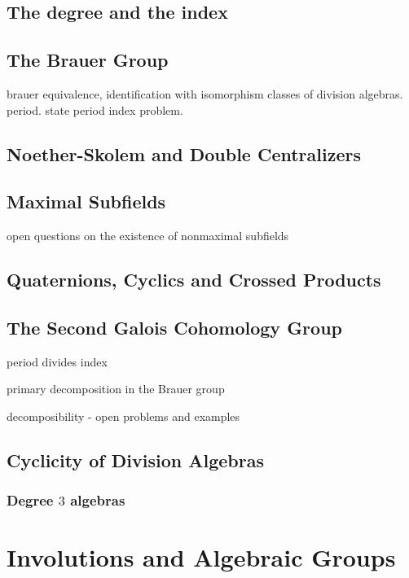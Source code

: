 \documentclass[12pt]{report}
\theoremstyle{plain}
\newcommand{\todo}[1]{\textcolor{todo}{#1}}
\begin{document}
\section{The degree and the index}


\section{The Brauer Group}

\todo{
brauer equivalence, identification with isomorphism classes of division
algebras. period. state period index problem.
}

\section{Noether-Skolem and Double Centralizers}

\section{Maximal Subfields}

\todo{open questions on the existence of nonmaximal subfields}

\section{Quaternions, Cyclics and Crossed Products}

\section{The Second Galois Cohomology Group}

\todo{period divides index}

\todo{primary decomposition in the Brauer group}

\todo{decomposibility - open problems and examples}

\section{Cyclicity of Division Algebras}

\subsection{Degree $3$ algebras}

\iffalse

\chapter{Involutions and Algebraic Groups}
\end{document}

